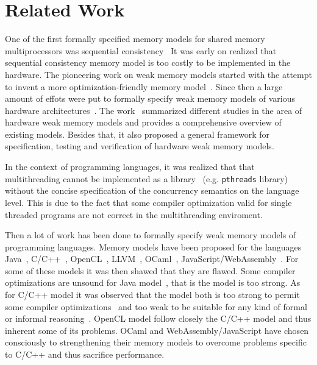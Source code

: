 \section{Related Work}

One of the first formally specified memory models 
for shared memory multiprocessors was sequential consistency~\cite{Lamport:TC79}
It was early on realized that sequential consistency memory model 
is too costly to be implemented in the hardware. 
The pioneering work on weak memory models started with the attempt to 
invent a more optimization-friendly memory model~\cite{Adve:PhD93, Adve:Comp96}.
Since then a large amount of effots were put to formally specify weak memory models of various 
hardware architectures~\cite{Chong-ASPLOS08, Alglave-DAMP09, Sewell-al:CACM10, Sarkar-al:PLDI11, Flur-al:POPL16}.
The work~\cite{Alglave-al:TOPLAS14} summarized different studies in the area 
of hardware weak memory models and provides a comprehensive overview of existing models.  
Besides that, it also proposed a general framework for specification, 
testing and verification of hardware weak memory models.

In the context of programming languages, 
it was realized that that multithreading cannot
be implemented as a library~\cite{Boehm:ACM05} (e.g. \texttt{pthreads} library)
without the concise specification of the concurrency semantics on the language level.
This is due to the fact that some compiler optimization 
valid for single threaded programs are not correct in the multithreading enviroment.

Then a lot of work has been done to formally specify 
weak memory models of programming languages.
Memory models have been proposed for the languages
Java~\cite{Manson-al:POPL05}, 
C/C++~\cite{Boehm-Adve:PLDI08, Batty-al:POPL11}, 
OpenCL~\cite{Batty-el:POPL16}, LLVM~\cite{Chakraborty-Vafeiadis:CGO17}, 
OCaml~\cite{Dolan-al:PLDI18}, JavaScript/WebAssembly~\cite{Watt-el:OOPSLA19, Watt-el:PLDI2020}.
For some of these models it was then shawed that they are flawed.
Some compiler optimizations are unsound for Java model~\cite{Sevcik-Aspinall:ECOOP08}, 
that is the model is too strong.
As for C/C++ model it was observed that the model both is too strong 
to permit some compiler optimizations~\cite{Vafeiadis-al:POPL15} and too weak to 
be suitable for any kind of formal or informal reasoning~\cite{Boehm-Demsky:MSPC14}. 
OpenCL model follow closely the C/C++ model and thus inherent some of its problems.
OCaml and WebAssembly/JavaScript have chosen consciously to strengthening their memory models
to overcome problems specific to C/C++ and thus sacrifice performance. 

